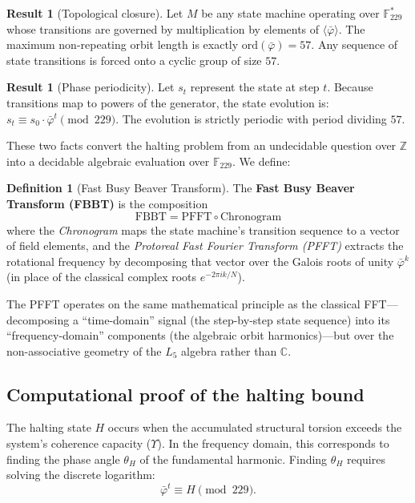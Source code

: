 \documentclass[12pt,oneside]{article}
\theoremstyle{principia}
\theoremstyle{definition}
\newtheorem{definition}[theorem]{Definition}
\newtheorem{result}[theorem]{Result}
\theoremstyle{remark}
\begin{document}
\begin{result}[Topological closure]
\label{res:closure}
Let $M$ be any state machine operating over
$\mathbb{F}_{229}^*$ whose transitions are governed by
multiplication by elements of $\langle\bar\varphi\rangle$.
The maximum non-repeating orbit length is exactly
$\mathrm{ord}(\bar\varphi) = 57$. Any sequence of state
transitions is forced onto a cyclic group of size $57$.
\end{result}

\begin{result}[Phase periodicity]
\label{res:phase}
Let $s_t$ represent the state at step $t$. Because transitions
map to powers of the generator, the state evolution is:
$s_t \equiv s_0 \cdot \bar\varphi^t \pmod{229}$.
The evolution is strictly periodic with period dividing $57$.
\end{result}

These two facts convert the halting problem from an undecidable
question over $\mathbb{Z}$ into a decidable algebraic evaluation
over $\mathbb{F}_{229}$. We define:

\begin{definition}[Fast Busy Beaver Transform]
\label{def:fbbt}
The \textbf{Fast Busy Beaver Transform (FBBT)} is the composition
\[
\mathrm{FBBT} = \mathrm{PFFT} \circ \mathrm{Chronogram}
\]
where the \emph{Chronogram} maps the state machine's transition
sequence to a vector of field elements, and the \emph{Protoreal
Fast Fourier Transform (PFFT)} extracts the rotational frequency
by decomposing that vector over the Galois roots of unity
$\bar\varphi^{k}$ (in place of the classical complex roots
$e^{-2\pi i k/N}$).
\end{definition}

The PFFT operates on the same mathematical principle as the
classical FFT---decomposing a ``time-domain'' signal (the step-by-step
state sequence) into its ``frequency-domain'' components (the
algebraic orbit harmonics)---but over the non-associative geometry
of the $L_5$ algebra rather than $\mathbb{C}$.

\subsection{Computational proof of the halting bound}

The halting state $H$ occurs when the accumulated structural
torsion exceeds the system's coherence capacity ($\Upsilon$).
In the frequency domain, this corresponds to finding the phase
angle $\theta_H$ of the fundamental harmonic. Finding $\theta_H$
requires solving the discrete logarithm:
\[
\bar\varphi^t \equiv H \pmod{229}.
\]
\end{document}
